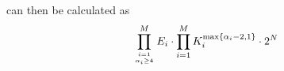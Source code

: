 \documentclass[conference]{IEEEtran}
\begin{document}
can then be calculated as
\begin{equation}\label{equ:tmech_complexity}
\prod\limits_{i=1\atop\alpha_i \geq 4}^{M}E_i\cdot \prod\limits_{i = 1}^M K_i^{\max\{\alpha_i-2, 1\}} \cdot 2^N
\end{equation}

\end{document}
